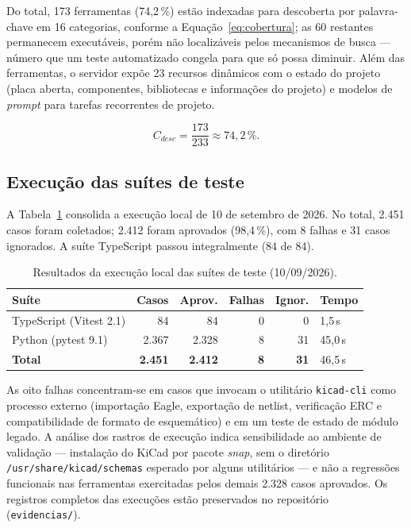 Do total, 173 ferramentas (74,2\,\%) estão indexadas para descoberta por
palavra-chave em 16 categorias, conforme a Equação~\ref{eq:cobertura}; as 60
restantes permanecem executáveis, porém não localizáveis pelos mecanismos de
busca --- número que um teste automatizado congela para que só possa diminuir.
Além das ferramentas, o servidor expõe 23 recursos dinâmicos com o estado do
projeto (placa aberta, componentes, bibliotecas e informações do projeto) e
modelos de \emph{prompt} para tarefas recorrentes de projeto.

\begin{equation}
\label{eq:cobertura}
C_{desc} = \frac{173}{233} \approx 74{,}2\,\%.
\end{equation}

\subsection{Execução das suítes de teste}

A Tabela~\ref{tab:testes} consolida a execução local de 10 de setembro de 2026.
No total, 2.451 casos foram coletados; 2.412 foram aprovados (98,4\,\%), com 8
falhas e 31 casos ignorados. A suíte TypeScript passou integralmente
(84 de 84).

\begin{table}[htbp]
\centering
\small
\caption{Resultados da execução local das suítes de teste (10/09/2026).}
\label{tab:testes}
\begin{tabular}{@{}p{4.0cm}rrrrp{2.4cm}@{}}
\toprule
\textbf{Suíte} & \textbf{Casos} & \textbf{Aprov.} & \textbf{Falhas} & \textbf{Ignor.} & \textbf{Tempo} \\
\midrule
TypeScript (Vitest 2.1) & 84 & 84 & 0 & 0 & 1,5\,s \\
Python (pytest 9.1) & 2.367 & 2.328 & 8 & 31 & 45,0\,s \\
\midrule
\textbf{Total} & \textbf{2.451} & \textbf{2.412} & \textbf{8} & \textbf{31} & 46,5\,s \\
\bottomrule
\end{tabular}
\end{table}

As oito falhas concentram-se em casos que invocam o utilitário
\texttt{kicad-cli} como processo externo (importação Eagle, exportação de
netlist, verificação ERC e compatibilidade de formato de esquemático) e em um
teste de estado de módulo legado. A análise dos rastros de execução indica
sensibilidade ao ambiente de validação --- instalação do KiCad por pacote
\emph{snap}, sem o diretório \texttt{/usr/share/kicad/schemas} esperado por
alguns utilitários --- e não a regressões funcionais nas ferramentas exercitadas
pelos demais 2.328 casos aprovados. Os registros completos das execuções estão
preservados no repositório (\texttt{evidencias/}).

